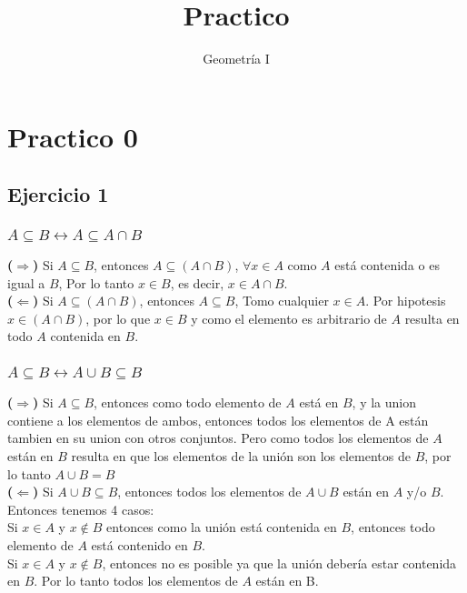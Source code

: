 \documentclass[a4paper]{article}
\title{Practico}
\author{Geometría I}
\begin{document}
\maketitle
\section{Practico 0}
\subsection{Ejercicio 1}
\subsubsection{$A \subseteq B \leftrightarrow A \subseteq A\cap B$}
\textbf{($\Rightarrow$)} Si $A \subseteq B$, entonces $A\subseteq(A\cap B)$, $\forall x \in A$ como $A$ está contenida o es igual a $B$, Por lo tanto $x \in B$, es decir, $x \in A\cap B$.\\
\textbf{($\Leftarrow$)} Si $A \subseteq (A\cap B)$, entonces $A \subseteq B$, Tomo cualquier $x \in A$. Por hipotesis $x \in (A\cap B)$, por lo que $x \in B$ y como el elemento es arbitrario de $A$ resulta en todo $A$ contenida en $B$.

\subsubsection{$A \subseteq B \leftrightarrow A\cup B \subseteq B$}
\textbf{($\Rightarrow$)} Si $A \subseteq B$, entonces como todo elemento de $A$ está en $B$, y la union contiene a los elementos de ambos, entonces todos los elementos de A están tambien en su union con otros conjuntos. Pero como todos los elementos de $A$ están en $B$ resulta en que los elementos de la unión son los elementos de $B$, por lo tanto $A\cup B = B$\\
\textbf{($\Leftarrow$)} Si $A\cup B \subseteq B$, entonces todos los elementos de $A\cup B$ están en $A$ y/o $B$. Entonces tenemos 4 casos:\\
Si $x \in A$ y $x \notin B$ entonces como la unión está contenida en $B$, entonces todo elemento de $A$ está contenido en $B$.\\
Si $x \in A$ y $x\notin B$, entonces no es posible ya que la unión debería estar contenida en $B$. Por lo tanto todos los elementos de $A$ están en B.
\end{document}
